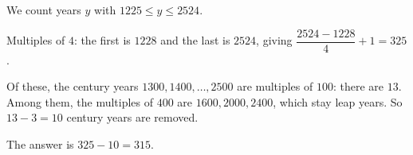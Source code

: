 We count years $y$ with $1225\le y\le2524$.

Multiples of $4$: the first is $1228$ and the last is $2524$, giving $\dfrac{2524-1228}{4}+1=325$.

Of these, the century years $1300,1400,\dots,2500$ are multiples of $100$: there are $13$. Among them, the multiples of $400$ are $1600,2000,2400$, which stay leap years. So $13-3=10$ century years are removed.

The answer is $325-10=\boxed{315}$.
